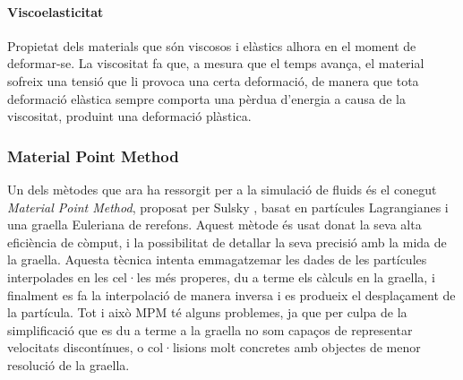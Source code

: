 \documentclass[a4paper]{report}
\begin{document}
	\paragraph{Viscoelasticitat} Propietat dels materials que són viscosos i elàstics alhora en el moment de deformar-se. La viscositat fa que, a mesura que el temps avança, el material sofreix una tensió que li provoca una certa deformació, de manera que tota deformació elàstica sempre comporta una pèrdua d'energia a causa de la viscositat, produint una deformació plàstica.
	
	\subsubsection[MPM]{Material Point Method}
	Un dels mètodes que ara ha ressorgit per a la simulació de fluids és el conegut \textit{Material Point Method}, proposat per Sulsky \cite{Sulsky1995}, basat en partícules Lagrangianes i una graella Euleriana de rerefons. Aquest mètode és usat donat la seva alta eficiència de còmput, i la possibilitat de detallar la seva precisió amb la mida de la graella. \newline
	Aquesta tècnica intenta emmagatzemar les dades de les partícules interpolades en les cel·les més properes, du a terme els càlculs en la graella, i finalment es fa la interpolació de manera inversa i es produeix el desplaçament de la partícula. \newline
	Tot i això MPM té alguns problemes, ja que per culpa de la simplificació que es du a terme a la graella no som capaços de representar velocitats discontínues, o col·lisions molt concretes amb objectes de menor resolució de la graella. 
	
\end{document}

